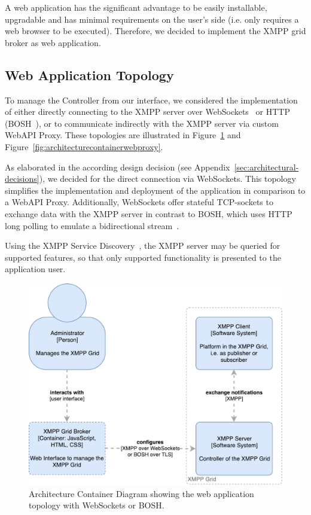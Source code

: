 A web application has the significant advantage to be easily installable, upgradable and has minimal requirements on the user's side (i.e. only requires a web browser to be executed).
Therefore, we decided to implement the XMPP grid broker as web application.

\subsection{Web Application Topology}

To manage the Controller from our interface, we considered the implementation of either directly connecting to the XMPP server over WebSockets~\cite{rfc7395} or HTTP (BOSH~\cite{xep-0124}), or to communicate indirectly with the XMPP server via custom WebAPI Proxy.
These topologies are illustrated in Figure~\ref{fig:architecturecontainerwebapplication} and Figure~\ref{fig:architecturecontainerwebproxy}.

As elaborated in the according design decision (see Appendix~\ref{sec:architectural-decisions}), we decided for the direct connection via WebSockets.
This topology simplifies the implementation and deployment of the application in comparison to a WebAPI Proxy.
Additionally, WebSockets offer stateful TCP-sockets to exchange data with the XMPP server in contrast to BOSH, which uses HTTP long polling to emulate a bidirectional stream~\cite{xep-0124}.

Using the XMPP Service Discovery~\cite{xep-0030}, the XMPP server may be queried for supported features, so that only supported functionality is presented to the application user.

\begin{figure}[h]
\centering
\includegraphics[width=0.7\linewidth]{resources/architecture_container_webapplication}
\caption[Architecture Container Diagram: Web Application]{Architecture Container Diagram showing the web application topology with WebSockets or BOSH.}
\label{fig:architecturecontainerwebapplication}
\end{figure}

